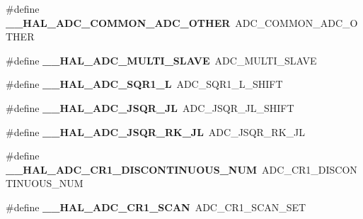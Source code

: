 \begin{DoxyCompactItemize}
\item 
\#define {\bfseries \+\_\+\+\_\+\+H\+A\+L\+\_\+\+A\+D\+C\+\_\+\+C\+O\+M\+M\+O\+N\+\_\+\+A\+D\+C\+\_\+\+O\+T\+H\+ER}~A\+D\+C\+\_\+\+C\+O\+M\+M\+O\+N\+\_\+\+A\+D\+C\+\_\+\+O\+T\+H\+ER\hypertarget{group___h_a_l___a_d_c___aliased___macros_gafa9bcc01aa0b2a887721e8971031ad0b}{}\label{group___h_a_l___a_d_c___aliased___macros_gafa9bcc01aa0b2a887721e8971031ad0b}

\item 
\#define {\bfseries \+\_\+\+\_\+\+H\+A\+L\+\_\+\+A\+D\+C\+\_\+\+M\+U\+L\+T\+I\+\_\+\+S\+L\+A\+VE}~A\+D\+C\+\_\+\+M\+U\+L\+T\+I\+\_\+\+S\+L\+A\+VE\hypertarget{group___h_a_l___a_d_c___aliased___macros_gaeff1a570027a91c87a339fd79704c3d2}{}\label{group___h_a_l___a_d_c___aliased___macros_gaeff1a570027a91c87a339fd79704c3d2}

\item 
\#define {\bfseries \+\_\+\+\_\+\+H\+A\+L\+\_\+\+A\+D\+C\+\_\+\+S\+Q\+R1\+\_\+L}~A\+D\+C\+\_\+\+S\+Q\+R1\+\_\+\+L\+\_\+\+S\+H\+I\+FT\hypertarget{group___h_a_l___a_d_c___aliased___macros_ga27072f37b7d50adad434a681331755f0}{}\label{group___h_a_l___a_d_c___aliased___macros_ga27072f37b7d50adad434a681331755f0}

\item 
\#define {\bfseries \+\_\+\+\_\+\+H\+A\+L\+\_\+\+A\+D\+C\+\_\+\+J\+S\+Q\+R\+\_\+\+JL}~A\+D\+C\+\_\+\+J\+S\+Q\+R\+\_\+\+J\+L\+\_\+\+S\+H\+I\+FT\hypertarget{group___h_a_l___a_d_c___aliased___macros_ga8764a28e2bb7d6a859fc52074e2ec1ec}{}\label{group___h_a_l___a_d_c___aliased___macros_ga8764a28e2bb7d6a859fc52074e2ec1ec}

\item 
\#define {\bfseries \+\_\+\+\_\+\+H\+A\+L\+\_\+\+A\+D\+C\+\_\+\+J\+S\+Q\+R\+\_\+\+R\+K\+\_\+\+JL}~A\+D\+C\+\_\+\+J\+S\+Q\+R\+\_\+\+R\+K\+\_\+\+JL\hypertarget{group___h_a_l___a_d_c___aliased___macros_ga51b8c1d68c48edfa958f988845d2ea41}{}\label{group___h_a_l___a_d_c___aliased___macros_ga51b8c1d68c48edfa958f988845d2ea41}

\item 
\#define {\bfseries \+\_\+\+\_\+\+H\+A\+L\+\_\+\+A\+D\+C\+\_\+\+C\+R1\+\_\+\+D\+I\+S\+C\+O\+N\+T\+I\+N\+U\+O\+U\+S\+\_\+\+N\+UM}~A\+D\+C\+\_\+\+C\+R1\+\_\+\+D\+I\+S\+C\+O\+N\+T\+I\+N\+U\+O\+U\+S\+\_\+\+N\+UM\hypertarget{group___h_a_l___a_d_c___aliased___macros_gab00342d0ece8deb8900df22b5193377e}{}\label{group___h_a_l___a_d_c___aliased___macros_gab00342d0ece8deb8900df22b5193377e}

\item 
\#define {\bfseries \+\_\+\+\_\+\+H\+A\+L\+\_\+\+A\+D\+C\+\_\+\+C\+R1\+\_\+\+S\+C\+AN}~A\+D\+C\+\_\+\+C\+R1\+\_\+\+S\+C\+A\+N\+\_\+\+S\+ET\hypertarget{group___h_a_l___a_d_c___aliased___macros_gae645d58040b162666fa506aeb3728f49}{}\label{group___h_a_l___a_d_c___aliased___macros_gae645d58040b162666fa506aeb3728f49}


\end{DoxyCompactItemize}
